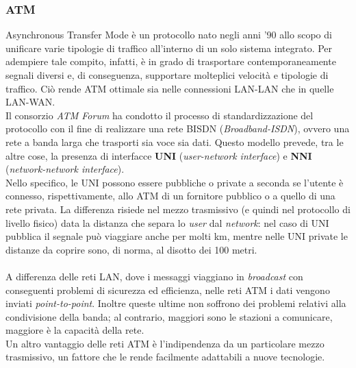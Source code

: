 \documentclass[a4paper,11pt]{article}
\def\vedi#1{\nameref{#1}}
\def\italic#1{\textit{#1}}
\begin{document}
\subsubsection{ATM}
Asynchronous Transfer Mode è un protocollo nato negli anni '90 allo scopo di unificare varie tipologie di traffico all'interno di un solo sistema integrato. Per adempiere tale compito, infatti, è in grado di trasportare contemporaneamente segnali diversi e, di conseguenza, supportare molteplici velocità e tipologie di traffico. Ciò rende ATM ottimale sia nelle connessioni LAN-LAN che in quelle LAN-WAN.
\\Il consorzio \textit{ATM Forum} ha condotto il processo di standardizzazione del protocollo con il fine di realizzare una rete BISDN (\textit{Broadband-ISDN}), ovvero una rete a banda larga che trasporti sia voce sia dati. Questo modello prevede, tra le altre cose, la presenza di interfacce \textbf{UNI} (\textit{user-network interface}) e \textbf{NNI} (\textit{network-network interface}).
\\Nello specifico, le UNI possono essere pubbliche o private a seconda se l'utente è connesso, rispettivamente, allo \vedi{Switch} ATM di un fornitore pubblico o a quello di una rete privata. La differenza risiede nel mezzo trasmissivo (e quindi nel protocollo di livello fisico) data la distanza che separa lo \textit{user} dal \textit{network}: nel caso di UNI pubblica il segnale può viaggiare anche per molti km, mentre nelle UNI private le distanze da coprire sono, di norma, al disotto dei 100 metri.
\\\\A differenza delle reti LAN, dove i messaggi viaggiano in \italic{broadcast} con conseguenti problemi di sicurezza ed efficienza, nelle reti ATM i dati vengono inviati \italic{point-to-point}. Inoltre queste ultime non soffrono dei problemi relativi alla condivisione della banda; al contrario, maggiori sono le stazioni a comunicare, maggiore è la capacità della rete.
\\Un altro vantaggio delle reti ATM è l'indipendenza da un particolare mezzo trasmissivo, un fattore che le rende facilmente adattabili a nuove tecnologie.
\end{document}
